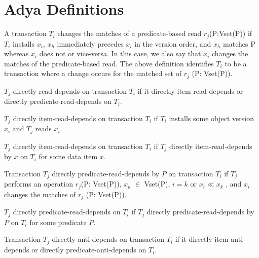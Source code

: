 
\normalsize

\section{Adya Definitions}

\begin{definition}
A transaction $T_i$ changes the matches
of a predicate-based read $r_j$(P:Vset(P)) if $T_i$ installs $x_i$, $x_h$
immediately precedes $x_i$ in the version order, and $x_h$ matches
P whereas $x_i$ does not or vice-versa. In this case, we also
say that $x_i$ changes the matches of the predicate-based read.
The above deﬁnition identiﬁes $T_i$ to be a transaction where
a change occurs for the matched set of $r_j$ (P: Vset(P)).
\end{definition}

\begin{definition}
$T_j$ directly read-depends on transaction $T_i$ if it directly
item-read-depends or directly predicate-read-depends on $T_i$.
\end{definition}

\begin{definition}
$T_j$ directly item-read-depends on transaction $T_i$ if $T_i$ installs some
  object version $x_i$ and $T_j$ reads $x_i$.
\end{definition}

\begin{definition}
$T_j$ directly item-read-depends on transaction $T_i$ if $T_j$
  directly item-read-depends by $x$ on $T_i$ for some data item $x$.
\end{definition}

\begin{definition}
Transaction $T_j$ directly predicate-read-depends by $P$ on
transaction $T_i$ if $T_j$ performs an operation $r_j$(P: Vset(P)),
$x_k$ $\in$ Vset(P), $i = k$ or $x_i \ll x_k$ , and $x_i$ changes the
matches of $r_j$ (P: Vset(P)).
\end{definition}

\begin{definition}
$T_j$ directly predicate-read-depends on $T_i$ if $T_j$ directly
  predicate-read-depends by $P$ on $T_i$ for some predicate $P$.
\end{definition}

\begin{definition}
Transaction $T_j$ directly anti-depends on transaction $T_i$ if it
directly item-anti-depends or directly predicate-anti-depends on
$T_i$.
\end{definition}

